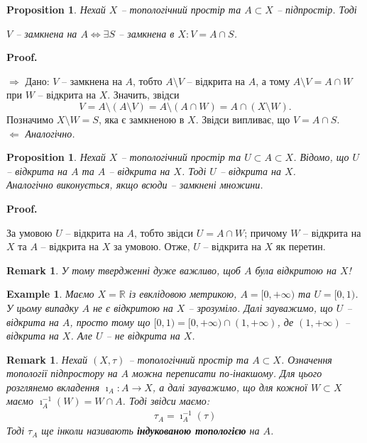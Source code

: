 \documentclass[a4paper, 10pt]{article}
\makeatletter
\def\rightproof{$\boxed{\Rightarrow}$ }
\def\leftproof{$\boxed{\Leftarrow}$ }
\theoremstyle{theoremdd}
\newtheorem{example}[theorem]{Example}
\newtheorem{proposition}[theorem]{Proposition}
\newtheorem{remark}[theorem]{Remark}
\renewenvironment{proof}[1][Proof.\\]{\par
\pushQED{\hfill \qed}%
\normalfont \topsep6\p@\@plus6\p@\relax
\trivlist
\item\relax
{\bfseries
#1\@addpunct{.}}\hspace\labelsep\ignorespaces
}{%
\popQED\endtrivlist\@endpefalse
}
\makeatother
\begin{document}
\begin{proposition}
Нехай $X$ -- топологічний простір та $A \subset X$ -- підпростір. Тоді
\begin{center}
$V$ -- замкнена на $A \iff \exists S$ -- замкнена в $X: V = A \cap S$.
\end{center}
\end{proposition}

\begin{proof}
\rightproof Дано: $V$ -- замкнена на $A$, тобто $A \setminus V$ -- відкрита на $A$, а тому $A \setminus V = A \cap W$ при $W$ -- відкрита на $X$. Значить, звідси 
\[
V = A \setminus (A \setminus V) = A \setminus (A \cap W) = A \cap (X \setminus W).
\]
Позначимо $X \setminus W = S$, яка є замкненою в $X$. Звідси випливає, що $V = A \cap S$.
\bigskip \\
\leftproof \textit{Аналогічно.}
\end{proof}

\begin{proposition}
Нехай $X$ -- топологічний простір та $U \subset A \subset X$. Відомо, що $U$ -- відкрита на $A$ та $A$ -- відкрита на $X$. Тоді $U$ -- відкрита на $X$.\\
\textit{Аналогічно виконується, якщо всюди -- замкнені множини.}
\end{proposition}

\begin{proof}
За умовою $U$ -- відкрита на $A$, тобто звідси $U = A \cap W$; причому $W$ -- відкрита на $X$ та $A$ -- відкрита на $X$ за умовою. Отже, $U$ -- відкрита на $X$ як перетин.
\end{proof}

\begin{remark}
У тому твердженні дуже важливо, щоб $A$ була відкритою на $X$!
\end{remark}

\begin{example}
Маємо $X = \mathbb{R}$ із евклідовою метрикою, $A = [0,+\infty)$ та $U = [0,1)$.\\
У цьому випадку $A$ не є відкритою на $X$ -- зрозуміло. Далі зауважимо, що $U$ -- відкрита на $A$, просто тому що $[0,1) = [0,+\infty) \cap (1,+\infty)$, де $(1,+\infty)$ -- відкрита на $X$. Але $U$ -- не відкрита на $X$.
\end{example}

\begin{remark}
Нехай $(X,\tau)$ -- топологічний простір та $A \subset X$. Означення топології підпростору на $A$ можна переписати по-інакшому. Для цього розглянемо вкладення $\imath_A \colon A \to X$, а далі зауважимо, що для кожної $W \subset X$ маємо $\imath_A^{-1}(W) = W \cap A$. Тоді звідси маємо:
\begin{align*}
\tau_A = \imath^{-1}_A(\tau)
\end{align*}
Тоді $\tau_A$ ще інколи називають \textbf{індукованою топологією} на $A$.
\end{remark}
\end{document}
